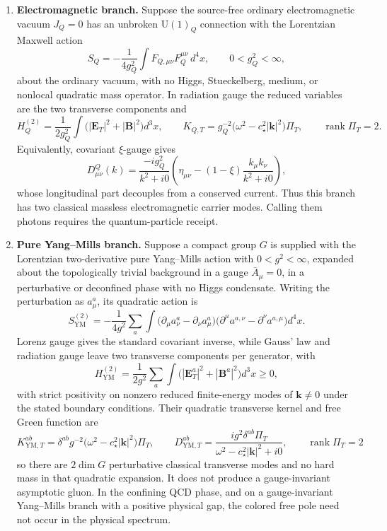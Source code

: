 \begin{enumerate}
\def\labelenumi{\roman{enumi}.}
\item \textbf{Electromagnetic branch.} Suppose the source-free ordinary electromagnetic vacuum
\(J_Q=0\) has an unbroken \(\mathrm U(1)_Q\) connection with
the Lorentzian Maxwell action
\[
S_Q=-\frac{1}{4g_Q^2}\int F_{Q,\mu\nu}F_Q^{\mu\nu}\,d^4x,
\qquad 0<g_Q^2<\infty,
\]
about the ordinary vacuum, with no Higgs, Stueckelberg, medium, or nonlocal quadratic mass
operator. In radiation gauge the reduced variables are the two transverse components and
\[
H_Q^{(2)}=\frac{1}{2g_Q^2}\int
\bigl(|\mathbf E_T|^2+|\mathbf B|^2\bigr)d^3x,
\qquad
K_{Q,T}=g_Q^{-2}
\bigl(\omega^2-c_\star^2|\mathbf k|^2\bigr)\Pi_T,
\qquad \operatorname{rank}\Pi_T=2.
\]
Equivalently, covariant \(\xi\)-gauge gives
\[
D^Q_{\mu\nu}(k)
=\frac{-ig_Q^2}{k^2+i0}
\left(\eta_{\mu\nu}-(1-\xi)\frac{k_\mu k_\nu}{k^2+i0}\right),
\]
whose longitudinal part decouples from a conserved current. Thus this branch has two classical
massless electromagnetic carrier modes. Calling them photons requires the quantum-particle
receipt.

\item \textbf{Pure Yang--Mills branch.} Suppose a compact group \(G\) is supplied with the
Lorentzian two-derivative pure Yang--Mills action with \(0<g^2<\infty\), expanded about the
topologically trivial background in a gauge \(\bar A_\mu=0\), in a perturbative or deconfined
phase with no Higgs condensate. Writing the perturbation as \(a_\mu^a\), its quadratic action is
\[
S_{\mathrm{YM}}^{(2)}
=-\frac{1}{4g^2}\sum_a\int
\bigl(\partial_\mu a_\nu^a-\partial_\nu a_\mu^a\bigr)
\bigl(\partial^\mu a^{a,\nu}-\partial^\nu a^{a,\mu}\bigr)d^4x.
\]
Lorenz gauge gives the standard covariant inverse, while Gauss' law and radiation gauge leave two
transverse components per generator, with
\[
H_{\mathrm{YM}}^{(2)}
=\frac{1}{2g^2}\sum_a\int
\bigl(|\mathbf E_T^a|^2+|\mathbf B^a|^2\bigr)d^3x\geq0,
\]
with strict positivity on nonzero reduced finite-energy modes of \(\mathbf k\neq0\) under the
stated boundary conditions. Their quadratic transverse kernel and free Green function are
\[
K^{ab}_{\mathrm{YM},T}
=\delta^{ab}g^{-2}
\bigl(\omega^2-c_\star^2|\mathbf k|^2\bigr)\Pi_T,
\qquad
D^{ab}_{\mathrm{YM},T}
=\frac{i g^2\delta^{ab}\Pi_T}
{\omega^2-c_\star^2|\mathbf k|^2+i0},
\qquad
\operatorname{rank}\Pi_T=2
\]
so there are \(2\dim G\) perturbative classical transverse modes and no hard mass in that
quadratic expansion.
It does not produce a gauge-invariant asymptotic gluon. In the confining QCD phase, and on a
gauge-invariant Yang--Mills branch with a positive physical gap, the colored free pole need not
occur in the physical spectrum.


\end{enumerate}
